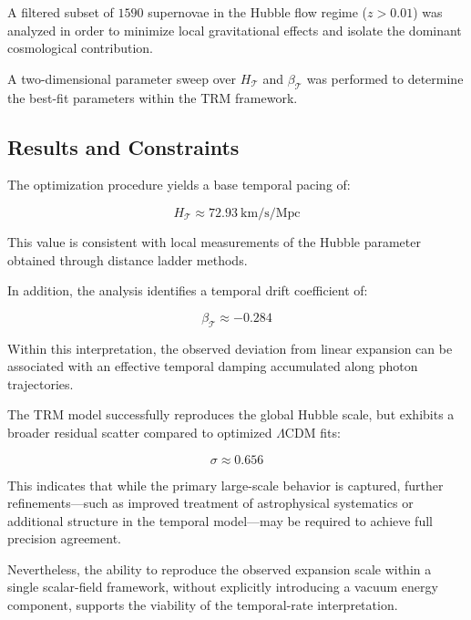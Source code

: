 \documentclass[11pt]{article}
\begin{document}
	A filtered subset of $1590$ supernovae in the Hubble flow regime ($z > 0.01$) was analyzed in order to minimize local gravitational effects and isolate the dominant cosmological contribution.

	A two-dimensional parameter sweep over $H_{\mathcal{T}}$ and $\beta_{\mathcal{T}}$ was performed to determine the best-fit parameters within the TRM framework.

	\subsection{Results and Constraints}

	The optimization procedure yields a base temporal pacing of:

	\begin{equation}
		H_{\mathcal{T}} \approx 72.93 \ \mathrm{km/s/Mpc}
	\end{equation}

	This value is consistent with local measurements of the Hubble parameter obtained through distance ladder methods.

	In addition, the analysis identifies a temporal drift coefficient of:

	\begin{equation}
		\beta_{\mathcal{T}} \approx -0.284
	\end{equation}

	Within this interpretation, the observed deviation from linear expansion can be associated with an effective temporal damping accumulated along photon trajectories.

	The TRM model successfully reproduces the global Hubble scale, but exhibits a broader residual scatter compared to optimized $\Lambda$CDM fits:

	\begin{equation}
		\sigma \approx 0.656
	\end{equation}

	This indicates that while the primary large-scale behavior is captured, further refinements—such as improved treatment of astrophysical systematics or additional structure in the temporal model—may be required to achieve full precision agreement.

	Nevertheless, the ability to reproduce the observed expansion scale within a single scalar-field framework, without explicitly introducing a vacuum energy component, supports the viability of the temporal-rate interpretation.
\end{document}
